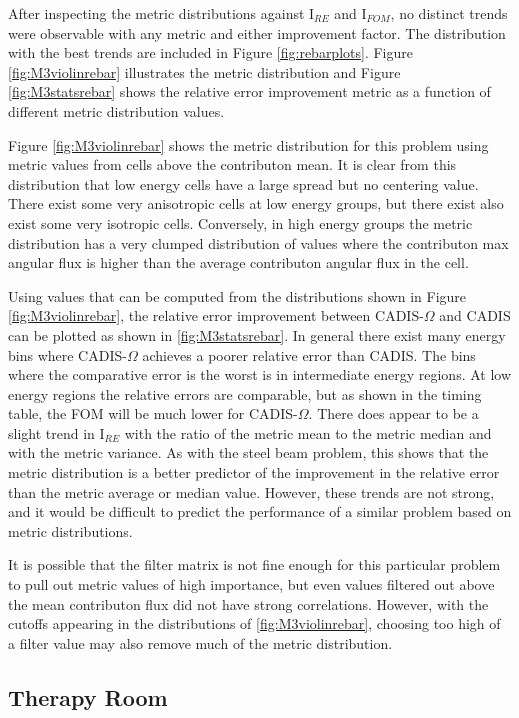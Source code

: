 After inspecting the metric distributions against I$_{RE}$ and I$_{FOM}$, no
distinct trends were observable with any metric and either improvement factor.
The distribution with the best trends are included in Figure
\ref{fig:rebarplots}. Figure \ref{fig:M3violinrebar} illustrates the
metric distribution and Figure \ref{fig:M3statsrebar} shows the relative error
improvement metric as a function of different metric distribution values.

Figure \ref{fig:M3violinrebar} shows the metric
distribution for this problem using metric values from cells above the
contributon mean. It is clear from this distribution that low energy cells have
a large spread but no centering value. There exist some very anisotropic cells
at low energy groups, but there exist also exist some very isotropic cells.
Conversely, in high energy groups the metric distribution has a very clumped
distribution of values where the contributon max angular flux is higher than the
average contributon angular flux in the cell.

Using values that can be computed from the distributions shown in Figure
\ref{fig:M3violinrebar}, the relative error improvement between CADIS-$\Omega$
and CADIS can be plotted as shown in \ref{fig:M3statsrebar}. In general there
exist many energy bins where CADIS-$\Omega$ achieves a poorer relative error
than CADIS. The bins where the comparative error is the worst is in intermediate
energy regions. At low energy regions the relative errors are comparable, but as
shown in the timing table, the FOM will be much lower for CADIS-$\Omega$. There
does appear to be a slight trend in I$_{RE}$ with the ratio of the metric mean
to the metric median and with the metric variance. As with the steel beam
problem, this shows that the metric distribution is a better predictor of the
improvement in the relative error than the metric average or median value.
However, these trends are not strong, and it would be difficult to predict the
performance of a similar problem based on metric distributions.

It is possible that the filter matrix is not fine enough for this particular
problem to pull out metric
values of high importance, but even values filtered out above the mean
contributon flux did not have strong correlations. However, with the cutoffs
appearing in the distributions of \ref{fig:M3violinrebar}, choosing too high of
a filter value may also remove much of the metric distribution.

\subsection{Therapy Room}
\label{subsec:resultstherapy}

